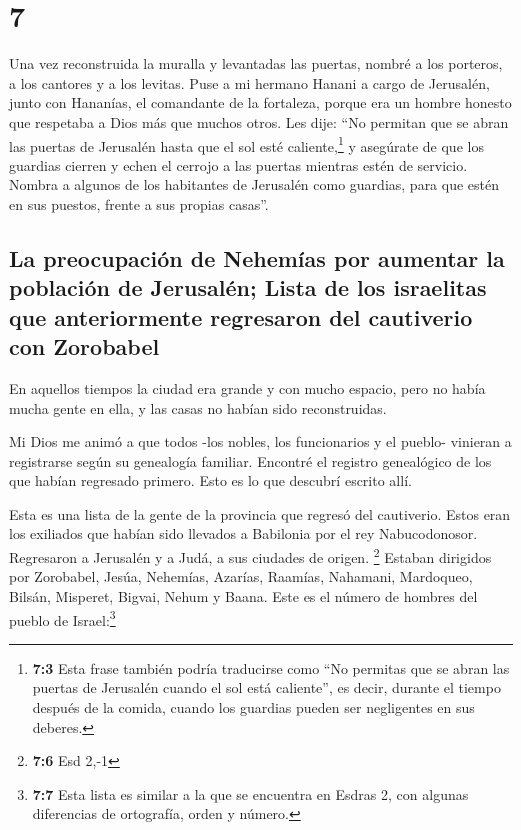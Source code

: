 \hypertarget{section-6}{%
\section{7}\label{section-6}}

 Una vez reconstruida la muralla y levantadas las puertas,
nombré a los porteros, a los cantores y a los levitas. 
Puse a mi hermano Hanani a cargo de Jerusalén, junto con Hananías, el
comandante de la fortaleza, porque era un hombre honesto que respetaba a
Dios más que muchos otros.  Les dije: ``No permitan que se
abran las puertas de Jerusalén hasta que el sol esté
caliente,\footnote{\textbf{7:3} Esta frase también podría traducirse
  como ``No permitas que se abran las puertas de Jerusalén cuando el sol
  está caliente'', es decir, durante el tiempo después de la comida,
  cuando los guardias pueden ser negligentes en sus deberes.} y
asegúrate de que los guardias cierren y echen el cerrojo a las puertas
mientras estén de servicio. Nombra a algunos de los habitantes de
Jerusalén como guardias, para que estén en sus puestos, frente a sus
propias casas''.

\hypertarget{la-preocupaciuxf3n-de-nehemuxedas-por-aumentar-la-poblaciuxf3n-de-jerusaluxe9n-lista-de-los-israelitas-que-anteriormente-regresaron-del-cautiverio-con-zorobabel}{%
\subsection{La preocupación de Nehemías por aumentar la población de
Jerusalén; Lista de los israelitas que anteriormente regresaron del
cautiverio con
Zorobabel}\label{la-preocupaciuxf3n-de-nehemuxedas-por-aumentar-la-poblaciuxf3n-de-jerusaluxe9n-lista-de-los-israelitas-que-anteriormente-regresaron-del-cautiverio-con-zorobabel}}

 En aquellos tiempos la ciudad era grande y con mucho
espacio, pero no había mucha gente en ella, y las casas no habían sido
reconstruidas.

 Mi Dios me animó a que todos -los nobles, los
funcionarios y el pueblo- vinieran a registrarse según su genealogía
familiar. Encontré el registro genealógico de los que habían regresado
primero. Esto es lo que descubrí escrito allí.

 Esta es una lista de la gente de la provincia que regresó
del cautiverio. Estos eran los exiliados que habían sido llevados a
Babilonia por el rey Nabucodonosor. Regresaron a Jerusalén y a Judá, a
sus ciudades de origen. \footnote{\textbf{7:6} Esd 2,-1} 
Estaban dirigidos por Zorobabel, Jesúa, Nehemías, Azarías, Raamías,
Nahamani, Mardoqueo, Bilsán, Misperet, Bigvai, Nehum y Baana. Este es el
número de hombres del pueblo de Israel:\footnote{\textbf{7:7} Esta lista
  es similar a la que se encuentra en Esdras 2, con algunas diferencias
  de ortografía, orden y número.}

